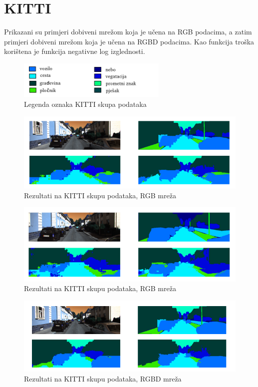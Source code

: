 \documentclass[times, utf8, diplomski, numeric]{fer}
\begin{document}
\section{KITTI}
Prikazani su primjeri dobiveni mrežom koja je učena na RGB podacima, a zatim primjeri dobiveni mrežom koja je učena na RGBD podacima.
Kao funkcija troška korištena je funkcija negativne log izglednosti.

\begin{figure}[H]
  \centering
  \includegraphics[width=270px]{imgs/legenda-oznaka.png}
  \caption{Legenda oznaka KITTI skupa podataka}
\end{figure}

\begin{figure}[H]
  \centering
  \includegraphics[width=\textwidth]{imgs/kitti-rgb1.png}
  \caption{Rezultati na KITTI skupu podataka, RGB mreža}
\end{figure}

\begin{figure}[H]
  \centering
  \includegraphics[width=\textwidth]{imgs/kitti-rgb2.png}
  \caption{Rezultati na KITTI skupu podataka, RGB mreža}
\end{figure}

\begin{figure}[H]
  \centering
  \includegraphics[width=\textwidth]{imgs/kitti3.png}
  \caption{Rezultati na KITTI skupu podataka, RGBD mreža}
\end{figure}
\end{document}
